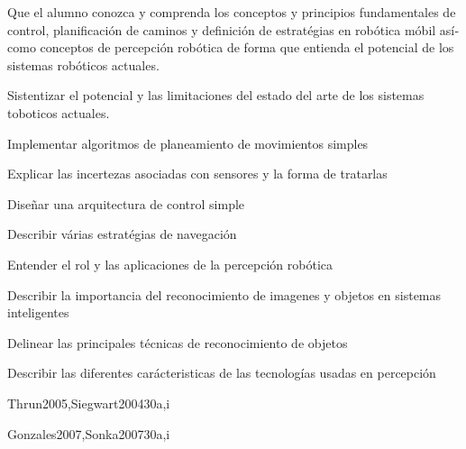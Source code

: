\begin{syllabus}


\begin{justification}
Que el alumno conozca y comprenda los conceptos y principios fundamentales de control, planificación de caminos 
y definición de estratégias en robótica móbil así­ como conceptos de percepción robótica de forma que entienda 
el potencial de los sistemas robóticos actuales.
\end{justification}

\begin{goals}
\item Sistentizar el potencial y las limitaciones del estado del arte de los sistemas toboticos actuales.
\item Implementar algoritmos de planeamiento de movimientos simples
\item Explicar las incertezas asociadas con sensores y la forma de tratarlas
\item Diseñar una arquitectura de control simple
\item Describir várias estratégias de navegación
\item Entender el rol y las aplicaciones de la percepción robótica
\item Describir la importancia del reconocimiento de imagenes y objetos en sistemas inteligentes
\item Delinear las principales técnicas de reconocimiento de objetos
\item Describir las diferentes carácteristicas de las tecnologías usadas en percepción
\end{goals}

\begin{outcomes}
\end{outcomes}

\begin{unit}{\ISRoboticsDef}{Thrun2005,Siegwart2004}{30}{a,i}
   \ISRoboticsAllTopics
   \ISRoboticsAllObjectives
\end{unit}

\begin{unit}{\ISPerceptionDef}{Gonzales2007,Sonka2007}{30}{a,i}
   \ISPerceptionAllTopics
   \ISPerceptionAllObjectives
\end{unit}



\begin{coursebibliography}
\end{coursebibliography}

\end{syllabus}
